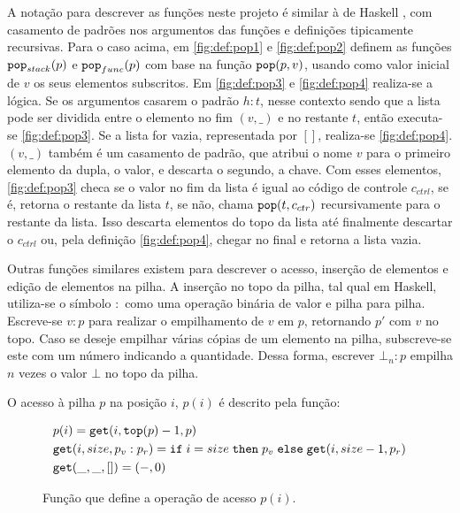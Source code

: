 A notação para descrever as funções neste projeto é similar à de Haskell \cite{HASKELL}, com casamento de padrões nos argumentos das funções e definições tipicamente recursivas. Para o caso acima, em \ref{fig:def:pop1} e \ref{fig:def:pop2} definem as funções $\texttt{pop}_{stack}(p)$ e $\texttt{pop}_{func}(p)$ com base na função $\texttt{pop}(p, v)$, usando como valor inicial de $v$ os seus elementos subscritos. Em \ref{fig:def:pop3} e \ref{fig:def:pop4} realiza-se a lógica. Se os argumentos casarem o padrão $h : t$, nesse contexto sendo que a lista pode ser dividida entre o elemento no fim $(v, \_)$ e no restante $t$, então executa-se \ref{fig:def:pop3}. Se a lista for vazia, representada por $[]$, realiza-se \ref{fig:def:pop4}. $(v,\_)$ também é um casamento de padrão, que atribui o nome $v$ para o primeiro elemento da dupla, o valor, e descarta o segundo, a chave. Com esses elementos, \ref{fig:def:pop3} checa se o valor no fim da lista é igual ao código de controle $c_{ctrl}$, se é, retorna o restante da lista $t$, se não, chama $\texttt{pop}(t, c_{ctr})$ recursivamente para o restante da lista. Isso descarta elementos do topo da lista até finalmente descartar o $c_{ctrl}$ ou, pela definição \ref{fig:def:pop4}, chegar no final e retorna a lista vazia.

Outras funções similares existem para descrever o acesso, inserção de elementos e edição de elementos na pilha. A inserção no topo da pilha, tal qual em Haskell, utiliza-se o símbolo $:$ como uma operação binária de valor e pilha para pilha. Escreve-se $v : p$ para realizar o empilhamento de $v$ em $p$, retornando $p'$ com $v$ no topo. Caso se deseje empilhar várias cópias de um elemento na pilha, subscreve-se este com um número indicando a quantidade. Dessa forma, escrever $\bot_n : p$ empilha $n$ vezes o valor $\bot$ no topo da pilha. 

O acesso à pilha $p$ na posição $i$, $p(i)$ é descrito pela função:

\begin{figure}[ht]
	\begin{align}
	&p(i) = \texttt{get}(i, \texttt{top}(p) - 1, p) \label{fig:def:px1}\\
	&\texttt{get}(i, size, p_v : p_r) = \texttt{if}\;i = size \;\texttt{then}\;p_v\;\texttt{else}\;\texttt{get}(i, size - 1, p_r) \label{fig:def:px2}\\
	&\texttt{get}(\_, \_, []) = (-,0) \label{fig:def:px3}
	\end{align}
	\caption{Função que define a operação de acesso $p(i)$.}
	\label{fig:def:px}
\end{figure}

